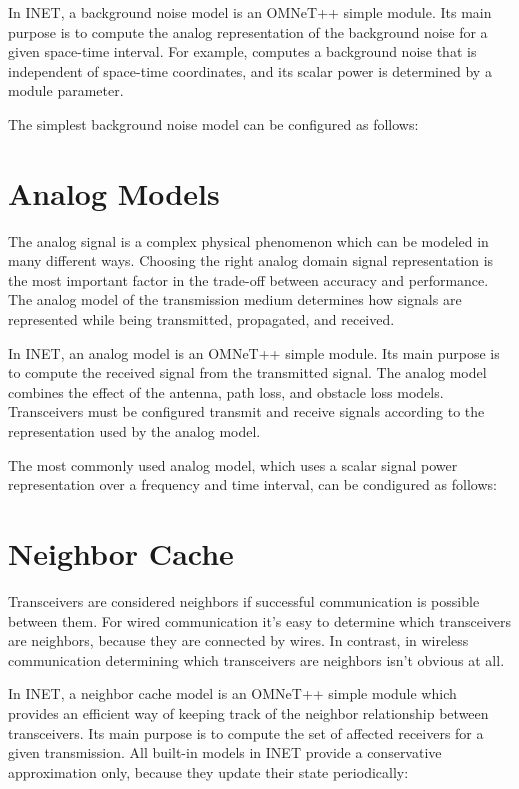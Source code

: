 In INET, a background noise model is an OMNeT++ simple module. Its main
purpose is to compute the analog representation of the background noise for
a given space-time interval. For example,
 computes a background noise that is
independent of space-time coordinates, and its scalar power is determined
by a module parameter.

The simplest background noise model can be configured as follows:


\section{Analog Models}

The analog signal is a complex physical phenomenon which can be modeled in
many different ways. Choosing the right analog domain signal representation
is the most important factor in the trade-off between accuracy and
performance. The analog model of the transmission medium determines how
signals are represented while being transmitted, propagated, and received.

In INET, an analog model is an OMNeT++ simple module. Its main purpose is
to compute the received signal from the transmitted signal. The analog
model combines the effect of the antenna, path loss, and obstacle loss
models. Transceivers must be configured transmit and receive signals
according to the representation used by the analog model.

The most commonly used analog model, which uses a scalar signal power
representation over a frequency and time interval, can be condigured as
follows:


\section{Neighbor Cache}

Transceivers are considered neighbors if successful communication is
possible between them. For wired communication it’s easy to determine
which transceivers are neighbors, because they are connected by wires. In
contrast, in wireless communication determining which transceivers are
neighbors isn’t obvious at all.

In INET, a neighbor cache model is an OMNeT++ simple module which provides
an efficient way of keeping track of the neighbor relationship between
transceivers. Its main purpose is to compute the set of affected receivers
for a given transmission. All built-in models in INET provide a
conservative approximation only, because they update their state
periodically:

